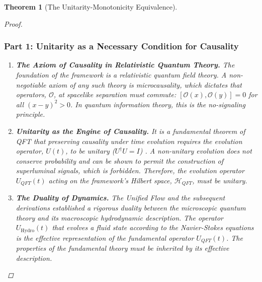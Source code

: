 \documentclass[11pt, letterpaper]{report}
\theoremstyle{plain} %
\newtheorem{theorem}{Theorem}[chapter]
\theoremstyle{definition} %
\theoremstyle{remark} %
\begin{document}
\begin{theorem}[The Unitarity-Monotonicity Equivalence]
\begin{proof}
\subsubsection*{Part 1: Unitarity as a Necessary Condition for Causality}

\begin{enumerate}
    \item \textbf{The Axiom of Causality in Relativistic Quantum Theory.}
    The foundation of the framework is a relativistic quantum field theory. A non-negotiable axiom of any such theory is microcausality, which dictates that operators, $\mathcal{O}$, at spacelike separation must commute: $[\mathcal{O}(x), \mathcal{O}(y)] = 0$ for all $(x-y)^2 > 0$. In quantum information theory, this is the no-signaling principle.

    \item \textbf{Unitarity as the Engine of Causality.}
    It is a fundamental theorem of QFT that preserving causality under time evolution requires the evolution operator, $U(t)$, to be unitary ($U^\dagger U = I$) \cite{Weinberg1995QFT}. A non-unitary evolution does not conserve probability and can be shown to permit the construction of superluminal signals, which is forbidden. Therefore, the evolution operator $U_{QFT}(t)$ acting on the framework's Hilbert space, $\mathcal{H}_{QFT}$, must be unitary.

    \item \textbf{The Duality of Dynamics.}
    The Unified Flow and the subsequent derivations established a rigorous duality between the microscopic quantum theory and its macroscopic hydrodynamic description. The operator $U_{\text{Hydro}}(t)$ that evolves a fluid state according to the Navier-Stokes equations is the effective representation of the fundamental operator $U_{QFT}(t)$. The properties of the fundamental theory must be inherited by its effective description.


\end{enumerate}
\end{proof}
\end{theorem}
\end{document}
